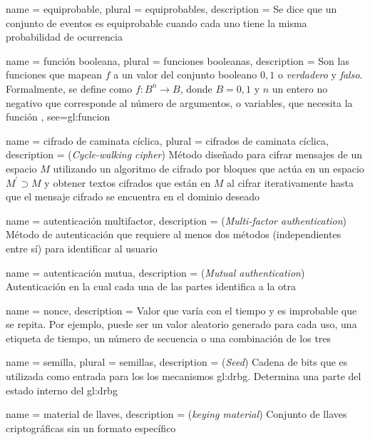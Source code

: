 {
  name = equiprobable,
  plural = equiprobables,
  description = {
    Se dice que un conjunto de eventos es equiprobable cuando cada uno tiene
    la misma probabilidad de ocurrencia%
  }
}

{
  name = función booleana,
  plural = funciones booleanas,
  description = {
    Son las funciones que mapean $f$ a un valor del conjunto booleano ${0,1}$ o
    \textit{verdadero} y \textit{falso}.
    Formalmente, se define como $f: B^n \rightarrow B$, donde $B={0,1}$
    y $n$ un entero no negativo que corresponde al número de argumentos,
    o variables, que necesita la función%
  },
  see={gl:funcion}
}

{
  name = cifrado de caminata cíclica,
  plural = cifrados de caminata cíclica,
  description = {
    (\textit{Cycle-walking cipher}) Método diseñado para cifrar mensajes de un
    espacio $M$ utilizando un algoritmo de cifrado por bloques que actúa en un
    espacio $M^\prime \supset M$ y obtener textos cifrados que están en $M$ al
    cifrar iterativamente hasta que el mensaje cifrado se encuentra en el
    dominio deseado%
  }
}

{
  name = autenticación multifactor,
  description = {
    (\textit{Multi-factor authentication}) Método de autenticación que requiere
    al menos dos métodos (independientes entre sí) para identificar al usuario%
  }
}

{
  name = autenticación mutua,
  description = {
    (\textit{Mutual authentication}) Autenticación en la cual cada una de
    las partes identifica a la otra%
  }
}

{
  name = nonce,
  description = {
    Valor que varía con el tiempo y es improbable que se repita. Por ejemplo,
    puede ser un valor aleatorio generado para cada uso, una etiqueta de tiempo,
    un número de secuencia o una combinación de los tres%
  }
}

{
  name = semilla,
  plural = semillas,
  description = {
    (\textit{Seed}) Cadena de bits que es utilizada como entrada para los
    los mecanismos \gls{gl:drbg}. Determina una parte del estado interno
    del \gls{gl:drbg}%
  }
}

{
  name = material de llaves,
  description = {(\textit{keying material})
    Conjunto de llaves criptográficas sin un formato específico%
  }
}

